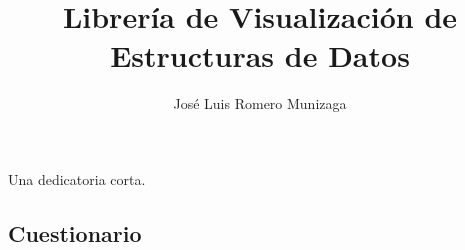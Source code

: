 \documentclass{umemoria}
\author{José Luis Romero Munizaga}
\title{Librería de Visualización de Estructuras de Datos}
\begin{document}
\frontmatter
\maketitle

\begin{resumen}
\end{resumen}


\begin{dedicatoria}
Una dedicatoria corta.
\end{dedicatoria}

\begin{thanks}
\end{thanks}

\tableofcontents
\listoftables %
\listoffigures %

\mainmatter









\printbibliography[
    heading=bibintoc,
]

\begin{appendices}
% 
\chapter{Cuestionario}
\label{anexo:cuestionario}

\end{appendices}
\end{document}
